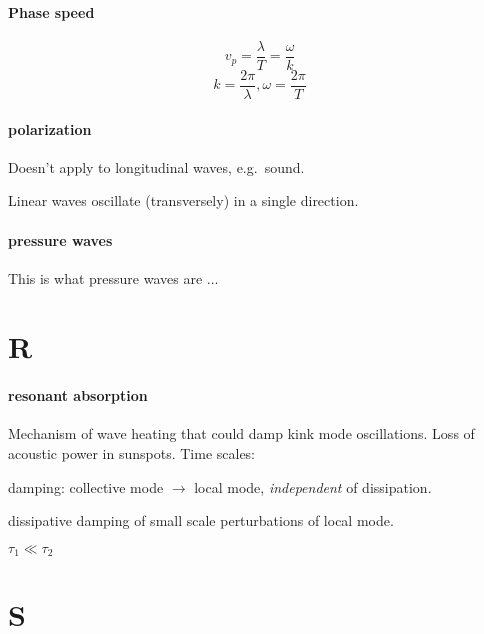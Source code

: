 \documentclass[12pt]{article}
\begin{document}
\paragraph{Phase speed}
$$ v_p = \frac{\lambda}{T} = \frac{\omega}{k} $$
$$ k = \frac{2\pi}{\lambda}, \omega = \frac{2\pi}{T} $$

\paragraph{polarization}
\begin{itemize*}
    \item Doesn't apply to longitudinal waves, e.g.\ sound.
    \item Linear waves oscillate (transversely) in a single direction.
\end{itemize*}

\paragraph{pressure waves}
This is what pressure waves are $\ldots$

\section*{R}
\paragraph{resonant absorption}
Mechanism of wave heating that could damp kink mode oscillations.
Loss of acoustic power in sunspots. Time scales:
\begin{enumerate*}
    \item damping: collective mode $\rightarrow$ local mode,
        \emph{independent} of dissipation.
    \item dissipative damping of small scale perturbations of local
        mode.
\end{enumerate*}
$\tau_1 \ll \tau_2$

\section*{S}
\end{document}
